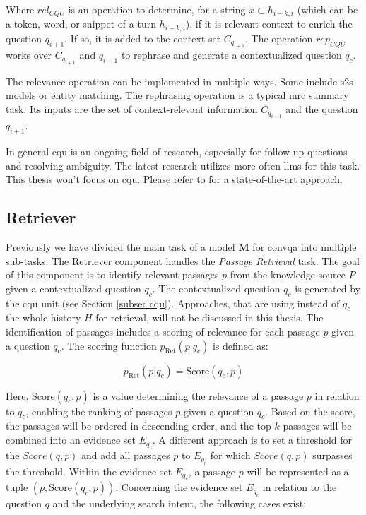 Where $rel_{CQU}$ is an operation to determine, for a string $x \subset h_{i-k,i}$ (which can be a token, word, or snippet of a turn $h_{i-k,i}$), if it is relevant context to enrich the question $q_{i+1}$. If so, it is added to the context set $C_{q_{i+1}}$. The operation $rep_{CQU}$ works over $C_{q_{i+1}}$ and $q_{i+1}$ to rephrase and generate a contextualized question $q_c$.

The relevance operation can be implemented in multiple ways. Some include \gls{s2s} models or entity matching. The rephrasing operation is a typical \gls{mrc} summary task. Its inputs are the set of context-relevant information $C_{q_{i+1}}$ and the question $q_{i+1}$.

In general \gls{cqu} is an ongoing field of research, especially for follow-up questions and resolving ambiguity. The latest research utilizes more often \gls{llm}s for this task. This thesis won't focus on \gls{cqu}. Please refer to \cite{mao_large_2023} for a state-of-the-art approach.

\subsection{Retriever}
\label{subsec:retriever}

Previously we have divided the main task of a model $\mathbf{M}$ for \gls{convqa} into multiple sub-tasks. The Retriever component handles the \textit{Passage Retrieval} task. The goal of this component is to identify relevant passages $p$ from the knowledge source $P$ given a contextualized question $q_c$. The contextualized question $q_c$ is generated by the \gls{cqu} unit (see Section \ref{subsec:cqu}). Approaches, that are using instead of $q_c$ the whole history $H$ for retrieval, will not be discussed in this thesis. The identification of passages includes a scoring of relevance for each passage $p$ given a question $q_c$. The scoring function $p_{\text{Ret}}(p|q_c)$ is defined as:

\begin{equation}
    p_{\text{Ret}}(p|q_c) = \text{Score}(q_c,p)
    \label{eq:retriever}
\end{equation}

Here, $\text{Score}(q_c,p)$ is a value determining the relevance of a passage $p$ in relation to $q_c$, enabling the ranking of passages $p$ given a question $q_c$. Based on the score, the passages will be ordered in descending order, and the top-$k$ passages will be combined into an evidence set $E_{q_c}$. A different approach is to set a threshold for the $Score(q,p)$ and add all passages $p$ to $E_{q_c}$ for which $Score(q,p)$ surpasses the threshold. Within the evidence set $E_{q_c}$, a passage $p$ will be represented as a tuple $(p, \text{Score}(q_c,p))$. Concerning the evidence set $E_{q_c}$ in relation to the question $q$ and the underlying search intent, the following cases exist:

